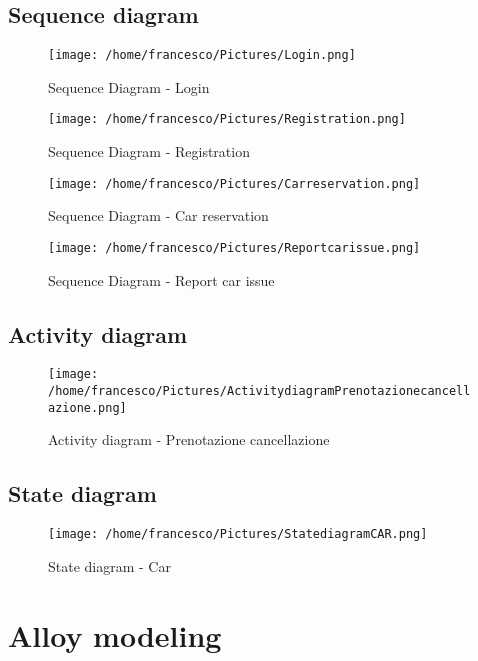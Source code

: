 \documentclass[10pt, a4paper,titlepage]{article}
\begin{document}
\subsection{Sequence diagram}
\begin{figure}[!h]
\texttt{[image: /home/francesco/Pictures/Login.png]}
\caption{Sequence Diagram - Login}
\label{fig:Sequence Diagram - Login}
\end{figure}
\clearpage
\begin{figure}[!h]
\texttt{[image: /home/francesco/Pictures/Registration.png]}
\caption{Sequence Diagram - Registration}
\label{fig:Sequence Diagram - Registration}
\end{figure}
\clearpage
\begin{figure}[!h]
\texttt{[image: /home/francesco/Pictures/Carreservation.png]}
\caption{Sequence Diagram - Car reservation}
\label{fig:Sequence Diagram - Car reservation}
\end{figure}
\clearpage
\begin{figure}[!h]
\texttt{[image: /home/francesco/Pictures/Reportcarissue.png]}
\caption{Sequence Diagram - Report car issue}
\label{fig:Sequence Diagram - Report car issue}
\end{figure}
\clearpage
\subsection{Activity diagram}
\begin{figure}[!h]
\texttt{[image: /home/francesco/Pictures/ActivitydiagramPrenotazionecancellazione.png]}
\caption{Activity diagram - Prenotazione cancellazione}
\label{fig:Activity diagram - Prenotazione cancellazione}
\end{figure}
\clearpage
\subsection{State diagram}
\begin{figure}[!h]
\texttt{[image: /home/francesco/Pictures/StatediagramCAR.png]}
\caption{State diagram - Car}
\label{fig:State diagram - Car}
\end{figure}
\clearpage
\section{Alloy modeling}
\end{document}

